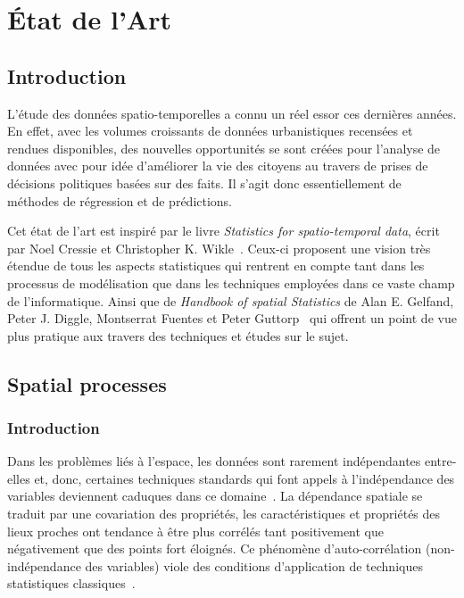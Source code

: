 \chapter{État de l'Art}

\section{Introduction}

L'étude des données spatio-temporelles a connu un réel essor ces dernières années. En effet, avec les volumes croissants de données urbanistiques recensées et rendues disponibles, des nouvelles opportunités se sont créées pour l'analyse de données avec pour idée d'améliorer la vie des citoyens au travers de prises de décisions politiques basées sur des faits. Il s'agit donc essentiellement de méthodes de régression et de prédictions.

Cet état de l'art est inspiré par le livre \textit{Statistics for spatio-temporal data}, écrit par Noel Cressie et Christopher K. Wikle~\cite{cressie2015statistics}. Ceux-ci proposent une vision très étendue de tous les aspects statistiques qui rentrent en compte tant dans les processus de modélisation que dans les techniques employées dans ce vaste champ de l'informatique. Ainsi que de \textit{Handbook of spatial Statistics} de Alan E. Gelfand, Peter J. Diggle, Montserrat Fuentes et Peter Guttorp~\cite{gelfand2010handbook} qui offrent un point de vue plus pratique aux travers des techniques et études sur le sujet.

\section{Spatial processes}

\subsection{Introduction}\label{SpatialProcesses}

Dans les problèmes liés à l'espace, les données sont rarement indépendantes entre-elles et, donc, certaines techniques standards qui font appels à l'indépendance des variables deviennent caduques dans ce domaine~\cite{de2010spatial}. La dépendance spatiale se traduit par une covariation des propriétés, les caractéristiques et propriétés des lieux proches ont tendance à être plus corrélés tant positivement que négativement que des points fort éloignés. Ce phénomène d'auto-corrélation (non-indépendance des variables) viole des conditions d'application de techniques statistiques classiques~\cite{legendre1993spatial}.

